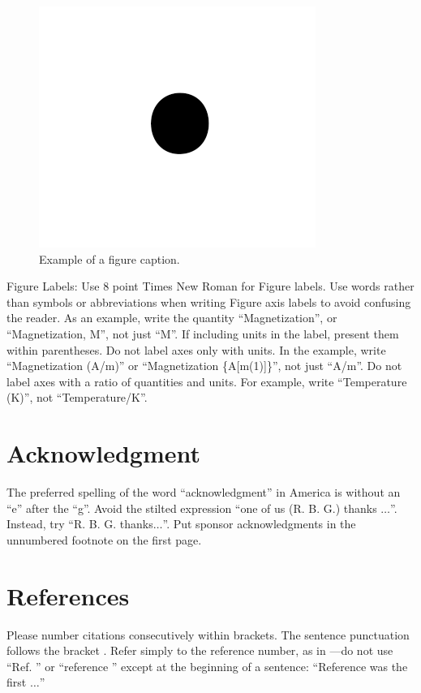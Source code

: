 \documentclass[conference]{IEEEtran}
\begin{document}
\begin{figure}[htbp]
\centerline{\includegraphics{fig1.png}}
\caption{Example of a figure caption.}
\label{fig}
\end{figure}

Figure Labels: Use 8 point Times New Roman for Figure labels. Use words 
rather than symbols or abbreviations when writing Figure axis labels to 
avoid confusing the reader. As an example, write the quantity 
``Magnetization'', or ``Magnetization, M'', not just ``M''. If including 
units in the label, present them within parentheses. Do not label axes only 
with units. In the example, write ``Magnetization (A/m)'' or ``Magnetization 
\{A[m(1)]\}'', not just ``A/m''. Do not label axes with a ratio of 
quantities and units. For example, write ``Temperature (K)'', not 
``Temperature/K''.

\section*{Acknowledgment}

The preferred spelling of the word ``acknowledgment'' in America is without 
an ``e'' after the ``g''. Avoid the stilted expression ``one of us (R. B. 
G.) thanks $\ldots$''. Instead, try ``R. B. G. thanks$\ldots$''. Put sponsor 
acknowledgments in the unnumbered footnote on the first page.

\section*{References}

Please number citations consecutively within brackets. The 
sentence punctuation follows the bracket . Refer simply to the reference 
number, as in \cite{b3}---do not use ``Ref. \cite{b3}'' or ``reference \cite{b3}'' except at 
the beginning of a sentence: ``Reference \cite{b3} was the first $\ldots$''
\end{document}
